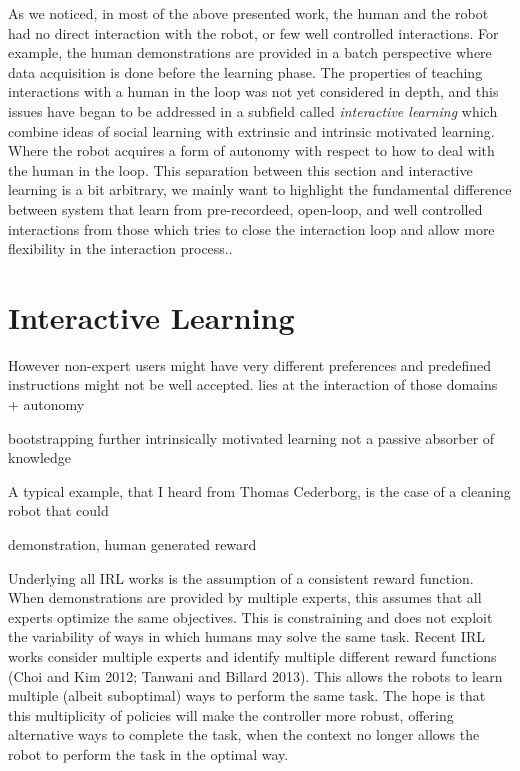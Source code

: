 As we noticed, in most of the above presented work, the human and the robot had no direct interaction with the robot, or few well controlled interactions. For example, the human demonstrations are provided in a batch perspective where data acquisition is done
before the learning phase. The properties of teaching interactions with a human in the loop was not yet considered in depth, and this issues have began to be addressed in a subfield called \emph{interactive learning}  which combine ideas of social learning with extrinsic and intrinsic motivated learning. Where the robot acquires a form of autonomy with respect to how to deal with the human in the loop. This separation between this section and interactive learning is a bit arbitrary, we mainly want to highlight the fundamental difference between system that learn from pre-recordeed, open-loop, and  well controlled interactions from those which tries to close the interaction loop and allow more flexibility in the interaction process..

\section{Interactive Learning}


However non-expert users might have very
different preferences and predefined instructions might not be
well accepted. lies at the interaction of those domains + autonomy

bootstrapping further intrinsically motivated learning \cite{nguyen2011bootstrapping}
not a passive absorber of knowledge


A typical example, that I heard from Thomas Cederborg, is the case of a cleaning robot that could

demonstration, human generated reward

Underlying all IRL works is the assumption of a consistent reward function. When demonstrations are provided by multiple experts, this assumes that all experts optimize the same objectives. This is constraining and does not exploit the variability of ways in which humans may solve the same task. Recent IRL works consider multiple experts and identify multiple different reward functions (Choi and Kim 2012; Tanwani and Billard 2013). This allows the robots to learn multiple (albeit suboptimal) ways to perform the same task. The hope is that this multiplicity of policies will make the controller more robust, offering alternative ways to complete the task, when the context no longer allows the robot to perform the task in the optimal way. 

